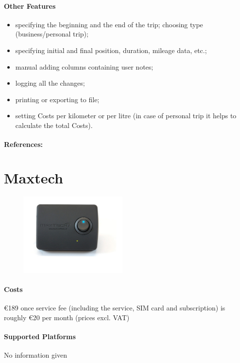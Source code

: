 \paragraph{Other Features}
\begin{itemize}
\item specifying the beginning and the end of the trip;
choosing type (business/personal trip);
\item specifying initial and final position, duration, mileage data, etc.;
\item manual adding columns containing user notes;
\item logging all the changes;
\item printing or exporting to file;
\item setting Costs per kilometer or per litre (in case of personal trip it helps to calculate the total Costs).
\end{itemize}
\paragraph{References:} \cite{Gurtam_Wialon_Driving_Logbook}
\newpage

\section{Maxtech}
\begin{figure}
  \begin{center}
    \includegraphics[width=0.48\textwidth]{bilder/logbook}
  \end{center}
\end{figure}
\paragraph{Costs} \euro 189 once
service fee (including the service, SIM card and subscription) is roughly \euro 20 per month (prices excl. VAT)
\paragraph{Supported Platforms} No information given
